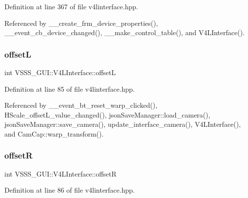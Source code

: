 Definition at line 367 of file v4linterface.\+hpp.



Referenced by \+\_\+\+\_\+create\+\_\+frm\+\_\+device\+\_\+properties(), \+\_\+\+\_\+event\+\_\+cb\+\_\+device\+\_\+changed(), \+\_\+\+\_\+make\+\_\+control\+\_\+table(), and V4\+L\+Interface().

\mbox{\label{class_v_s_s_s___g_u_i_1_1_v4_l_interface_a4e43fc5295bdec46e8e2fd24bf719e0b}} 
\subsubsection{\texorpdfstring{offsetL}{offsetL}}
{\footnotesize\ttfamily int V\+S\+S\+S\+\_\+\+G\+U\+I\+::\+V4\+L\+Interface\+::offsetL}



Definition at line 85 of file v4linterface.\+hpp.



Referenced by \+\_\+\+\_\+event\+\_\+bt\+\_\+reset\+\_\+warp\+\_\+clicked(), H\+Scale\+\_\+offset\+L\+\_\+value\+\_\+changed(), json\+Save\+Manager\+::load\+\_\+camera(), json\+Save\+Manager\+::save\+\_\+camera(), update\+\_\+interface\+\_\+camera(), V4\+L\+Interface(), and Cam\+Cap\+::warp\+\_\+transform().

\mbox{\label{class_v_s_s_s___g_u_i_1_1_v4_l_interface_a8bb9caa477b417f549198ea059375f06}} 
\subsubsection{\texorpdfstring{offsetR}{offsetR}}
{\footnotesize\ttfamily int V\+S\+S\+S\+\_\+\+G\+U\+I\+::\+V4\+L\+Interface\+::offsetR}



Definition at line 86 of file v4linterface.\+hpp.



